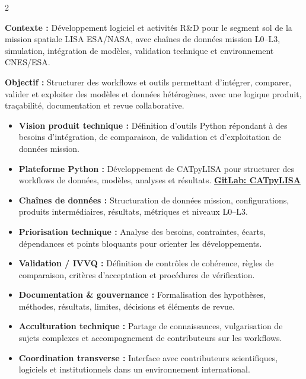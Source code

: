 \documentclass[8pt,a4paper,ragged2e,withhyper]{altacv}
\begin{document}
\begin{paracol}{2}
\divider


\textbf{Contexte :} Développement logiciel et activités R\&D pour le segment sol de la mission spatiale LISA ESA/NASA, avec chaînes de données mission L0--L3, simulation, intégration de modèles, validation technique et environnement CNES/ESA.

\textbf{Objectif :} Structurer des workflows et outils permettant d’intégrer, comparer, valider et exploiter des modèles et données hétérogènes, avec une logique produit, traçabilité, documentation et revue collaborative.

\begin{itemize}
  \item \textbf{Vision produit technique :} Définition d’outils Python répondant à des besoins d’intégration, de comparaison, de validation et d’exploitation de données mission.
  \item \textbf{Plateforme Python :} Développement de CATpyLISA pour structurer des workflows de données, modèles, analyses et résultats.
  \textcolor{DarkPastelRed}{\href{https://gitlab.oca.eu/gboileau/lisa_l3_tools}{\bf GitLab: CATpyLISA}}
  \item \textbf{Chaînes de données :} Structuration de données mission, configurations, produits intermédiaires, résultats, métriques et niveaux L0--L3.
  \item \textbf{Priorisation technique :} Analyse des besoins, contraintes, écarts, dépendances et points bloquants pour orienter les développements.
  \item \textbf{Validation / IVVQ :} Définition de contrôles de cohérence, règles de comparaison, critères d’acceptation et procédures de vérification.
  \item \textbf{Documentation \& gouvernance :} Formalisation des hypothèses, méthodes, résultats, limites, décisions et éléments de revue.
  \item \textbf{Acculturation technique :} Partage de connaissances, vulgarisation de sujets complexes et accompagnement de contributeurs sur les workflows.
  \item \textbf{Coordination transverse :} Interface avec contributeurs scientifiques, logiciels et institutionnels dans un environnement international.
\end{itemize}

\divider


\end{paracol}
\end{document}
